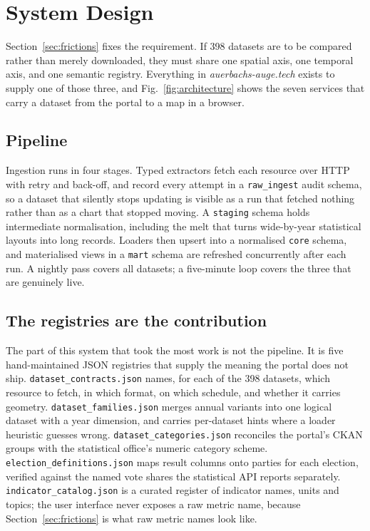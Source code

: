 \documentclass[conference,a4paper]{IEEEtran}
\begin{document}
\section{System Design}
\label{sec:system}

Section~\ref{sec:frictions} fixes the requirement. If 398 datasets are to be compared rather than
merely downloaded, they must share one spatial axis, one temporal axis, and one
semantic registry. Everything in \emph{auerbachs-auge.tech} exists to supply one
of those three, and Fig.~\ref{fig:architecture} shows the seven services that
carry a dataset from the portal to a map in a browser.

\subsection{Pipeline}
Ingestion runs in four stages. Typed extractors fetch each resource over HTTP
with retry and back-off, and record every attempt in a \texttt{raw\_ingest} audit
schema, so a dataset that silently stops updating is visible as a run that
fetched nothing rather than as a chart that stopped moving. A \texttt{staging}
schema holds intermediate normalisation, including the melt that turns
wide-by-year statistical layouts into long records. Loaders then upsert into a
normalised \texttt{core} schema, and materialised views in a \texttt{mart} schema
are refreshed concurrently after each run. A nightly pass covers all datasets; a
five-minute loop covers the three that are genuinely live.

\subsection{The registries are the contribution}
The part of this system that took the most work is not the pipeline. It is five
hand-maintained JSON registries that supply the meaning the portal does not ship.
\texttt{dataset\_contracts.json} names, for each of the 398 datasets, which
resource to fetch, in which format, on which schedule, and whether it carries
geometry. \texttt{dataset\_families.json} merges annual variants into one logical
dataset with a year dimension, and carries per-dataset hints where a loader
heuristic guesses wrong. \texttt{dataset\_categories.json} reconciles the
portal's CKAN groups with the statistical office's numeric category scheme.
\texttt{election\_definitions.json} maps result columns onto parties for each
election, verified against the named vote shares the statistical API reports
separately. \texttt{indicator\_catalog.json} is a curated register of indicator
names, units and topics; the user interface never exposes a raw metric name,
because Section~\ref{sec:frictions} is what raw metric names look like.
\end{document}
